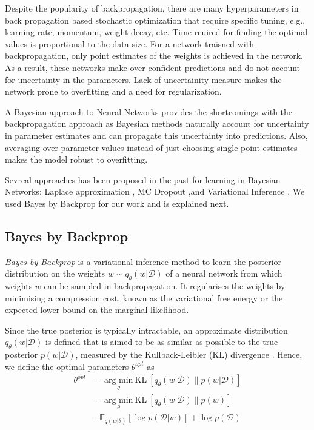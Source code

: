 Despite the popularity of backpropagation, there are many hyperparameters in back propagation based stochastic optimization
that require specific tuning, e.g., learning rate, momentum,
weight decay, etc. Time reuired for finding the optimal values is proportional to the data size. For a network traisned with backpropagation, only point estimates of the weights is achieved in the network. As a result, these networks make over confident predictions  and do not account for uncertainty in the parameters. Lack of uncertainity measure makes the network prone to overfitting and a need for regularization.

A Bayesian approach to Neural Networks provides the shortcomings with the backpropagation approach \cite{mackay1996hyperparameters} as Bayesian methods naturally account for uncertainty in parameter estimates and can propagate this uncertainty into predictions.
Also, averaging over parameter values instead of just choosing single point estimates makes the model robust to overfitting. 

Sevreal approaches has been proposed in the past for learning in Bayesian Networks: Laplace approximation \cite{Mackay1991APB}, MC Dropout \cite{gal2015bayesian},and Variational Inference \cite{hinton1993keeping} \cite{graves2011practical} \cite{blundell2015weight}. We used Bayes by Backprop \cite{blundell2015weight} for our work and is explained next.

\subsection{Bayes by Backprop}
\textit{Bayes by Backprop} \cite{graves2011practical, blundell2015weight} is a variational inference method to learn the posterior distribution on the weights $w \sim q_{\theta}(w|\mathcal{D})$ of a neural network from which weights $w$ can be sampled in backpropagation. 
It regularises the weights by minimising a compression cost, known as the variational free energy or the expected lower bound on the marginal likelihood.

Since the true posterior is typically intractable, an approximate distribution $q_{\theta}(w|\mathcal{D})$ is defined that is aimed to be as similar as possible to the true posterior $p(w|\mathcal{D})$, measured by the Kullback-Leibler (KL) divergence \cite{kullback1951information}. Hence, we define the optimal parameters $\theta^{opt}$ as
\begin{equation}
    \begin{aligned} \label{KL}
        \theta^{opt}&=\underset{\theta}{\text{arg min}}\ \text{KL} \ [q_{\theta}(w|\mathcal{D})\|p(w|\mathcal{D})] \\
        &=\underset{\theta}{\text{arg min}}\ \text{KL} \ [q_{\theta}(w|\mathcal{D})\|p(w)] \\ & -\mathbb{E}_{q(w|\theta)}[\log p(\mathcal{D}|w)]+\log p(\mathcal{D})
    \end{aligned}
\end{equation}

